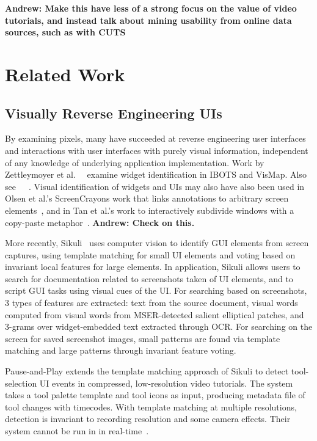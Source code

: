 \documentclass[12pt]{memoir}
\begin{document}
\textbf{Andrew: Make this have less of a strong focus on the value of
video tutorials, and instead talk about mining usability from online data
sources, such as with CUTS}


\section{Related Work}

\subsection{Visually Reverse Engineering UIs}

By examining pixels, many have succeeded at reverse engineering user interfaces
and interactions with user interfaces with purely visual information, independent
of any knowledge of underlying application implementation. Work 
by Zettleymoyer et al.~\cite{zettlemoyer_ibots_1999}~\cite{zettlemoyer_visual_1999}
examine widget identification in IBOTS and VisMap.  Also see~\cite{potter_triggers_1992}~\cite{amant_image_2005}~\cite{lieberman_visual_2001}. 
Visual identification of widgets and UIs may also have also been used in Olsen 
et al.'s ScreenCrayons work that links annotations to arbitrary screen 
elements~\cite{olsen_jr_implementing_1999},
and in Tan et al.'s work to interactively subdivide windows with a 
copy-paste metaphor~\cite{tan_wincuts_2004}.
\textbf{Andrew: Check on this.}

More recently, Sikuli~\cite{yeh_sikuli_2009} uses computer vision to 
identify GUI elements from screen captures, using template matching for small
UI elements and voting based on invariant local features for large elements.
In application, Sikuli allows users to search for documentation related to
screenshots taken of UI elements, and to script GUI tasks using visual
cues of the UI.  For searching based on screenshots, 3 types of features are 
extracted: text from the source document, visual words computed from visual 
words from MSER-detected salient elliptical patches, and 3-grams over widget-embedded 
text extracted through OCR.  For searching on the screen for saved 
screenshot images, small patterns are found via template matching and large 
patterns through invariant feature voting.

Pause-and-Play extends the template matching approach of Sikuli to detect 
tool-selection UI events in compressed, low-resolution video tutorials.  
The system takes a tool palette template and tool icons as input, 
producing metadata file of tool changes with timecodes.  With template 
matching at multiple resolutions, detection is invariant to recording 
resolution and some camera effects.  Their system cannot be run in in 
real-time~\cite{pongnumkul_pause-and-play_2011}.
\end{document}
